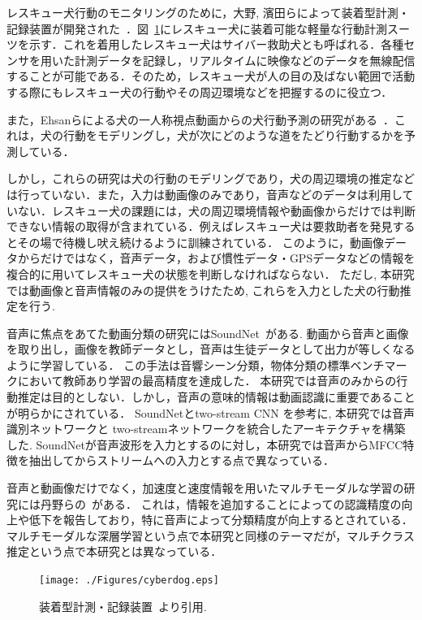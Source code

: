 \documentclass[MIRU,submit]{miru2019j}
\begin{document}
レスキュー犬行動のモニタリングのために，大野, 濱田らによって装着型計測・記録装置が開発された~\cite{dog01}．図~\ref{cyber}にレスキュー犬に装着可能な軽量な行動計測スーツを示す．これを着用したレスキュー犬はサイバー救助犬とも呼ばれる．各種センサを用いた計測データを記録し，リアルタイムに映像などのデータを無線配信することが可能である．そのため，レスキュー犬が人の目の及ばない範囲で活動する際にもレスキュー犬の行動やその周辺環境などを把握するのに役立つ．

また，Ehsanらによる犬の一人称視点動画からの犬行動予測の研究がある~\cite{whoretthedog}．これは，犬の行動をモデリングし，犬が次にどのような道をたどり行動するかを予測している．

しかし，これらの研究は犬の行動のモデリングであり，犬の周辺環境の推定などは行っていない．また，入力は動画像のみであり，音声などのデータは利用していない．レスキュー犬の課題には，犬の周辺環境情報や動画像からだけでは判断できない情報の取得が含まれている．例えばレスキュー犬は要救助者を発見するとその場で待機し吠え続けるように訓練されている．
このように，動画像データからだけではなく，音声データ，および慣性データ・GPSデータなどの情報を複合的に用いてレスキュー犬の状態を判断しなければならない．
ただし, 本研究では動画像と音声情報のみの提供をうけたため, これらを入力とした犬の行動推定を行う.

音声に焦点をあてた動画分類の研究にはSoundNet~\cite{aytar2016soundnet}がある.
動画から音声と画像を取り出し，画像を教師データとし，音声は生徒データとして出力が等しくなるように学習している．
この手法は音響シーン分類，物体分類の標準ベンチマークにおいて教師あり学習の最高精度を達成した．
本研究では音声のみからの行動推定は目的としない．しかし，音声の意味的情報は動画認識に重要であることが明らかにされている．
SoundNetとtwo-stream CNN を参考に, 本研究では音声識別ネットワークと two-streamネットワークを統合したアーキテクチャを構築した.
SoundNetが音声波形を入力とするのに対し，本研究では音声からMFCC特徴を抽出してからストリームへの入力とする点で異なっている．

音声と動画像だけでなく，加速度と速度情報を用いたマルチモーダルな学習の研究には丹野らの~\cite{tanno2019deim}がある．
これは，情報を追加することによっての認識精度の向上や低下を報告しており，特に音声によって分類精度が向上するとされている．
マルチモーダルな深層学習という点で本研究と同様のテーマだが，マルチクラス推定という点で本研究とは異なっている．

\begin{figure}[tb]
 \begin{center}
  \texttt{[image: ./Figures/cyberdog.eps]}
  \caption{装着型計測・記録装置~\cite{dog01}より引用.}
  \label{cyber}
 \end{center}
\end{figure}
\end{document}
